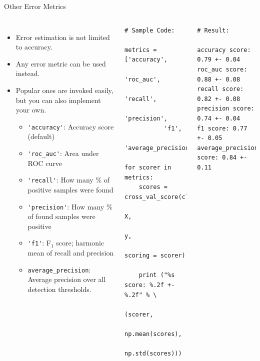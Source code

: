 \documentclass[10pt, aspectratio=169]{beamer} %
\begin{document}
\begin{frame}[fragile]{Other Error Metrics}
\begin{columns}
{\small\vspace*{-0.8cm}
\begin{itemize}
\item Error estimation is not limited to accuracy.
\item Any error metric can be used instead.
\item Popular ones are invoked easily, but you can also implement your own.
\begin{itemize}
	\item {\verb+'accuracy'+}: Accuracy score (default)
	\item {\verb+'roc_auc'+}: Area under ROC curve
  \item {\verb+'recall'+}: How many \% of positive samples were found
	\item {\verb+'precision'+}: How many \% of found samples were positive
	\item {\verb+'f1'+}: F$_1$ score; harmonic mean of recall and precision
	\item {\verb+average_precision+}: Average precision over all detection thresholds.
\end{itemize}
\end{itemize}
}
\begin{lstlisting}
# Sample Code:

metrics = ['accuracy',
           'roc_auc',
           'recall',
           'precision',
           'f1',
           'average_precision']

for scorer in metrics:
    scores = cross_val_score(clf, 
                   X, 
                   y, 
                   scoring = scorer)

    print ("%s score: %.2f +- %.2f" % \
          (scorer,
           np.mean(scores),
           np.std(scores)))
\end{lstlisting}
\begin{lstlisting}
# Result:

accuracy score: 0.79 +- 0.04
roc_auc score: 0.88 +- 0.08
recall score: 0.82 +- 0.08
precision score: 0.74 +- 0.04
f1 score: 0.77 +- 0.05
average_precision score: 0.84 +- 0.11
\end{lstlisting}
\end{columns}
\end{frame}
\end{document}
